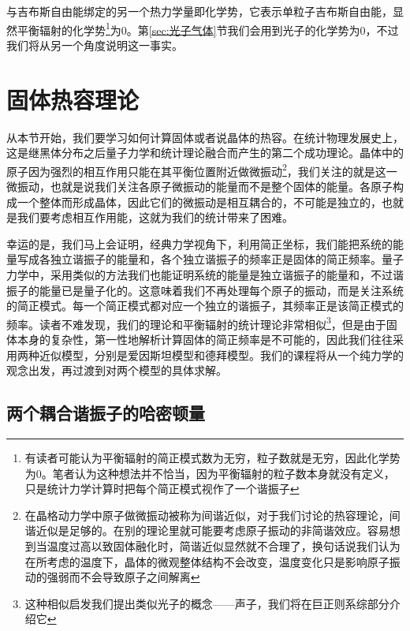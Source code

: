 \documentclass[../../main.tex]{subfiles}
\begin{document}
与吉布斯自由能绑定的另一个热力学量即化学势，它表示单粒子吉布斯自由能，显然平衡辐射的化学势\footnote{有读者可能认为平衡辐射的简正模式数为无穷，粒子数就是无穷，因此化学势为0。笔者认为这种想法并不恰当，因为平衡辐射的粒子数本身就没有定义，只是统计力学计算时把每个简正模式视作了一个谐振子}为0。第\ref{sec:光子气体}节我们会用到光子的化学势为0，不过我们将从另一个角度说明这一事实。

\section{固体热容理论}\label{sec:固体热容理论}
从本节开始，我们要学习如何计算固体或者说晶体的热容。在统计物理发展史上，这是继黑体分布之后量子力学和统计理论融合而产生的第二个成功理论。晶体中的原子因为强烈的相互作用只能在其平衡位置附近做微振动\footnote{在晶格动力学中原子做微振动被称为间谐近似，对于我们讨论的热容理论，间谐近似是足够的。在别的理论里就可能要考虑原子振动的非简谐效应。容易想到当温度过高以致固体融化时，简谐近似显然就不合理了，换句话说我们认为在所考虑的温度下，晶体的微观整体结构不会改变，温度变化只是影响原子振动的强弱而不会导致原子之间解离}，我们关注的就是这一微振动，也就是说我们关注各原子微振动的能量而不是整个固体的能量。各原子构成一个整体而形成晶体，因此它们的微振动是相互耦合的，不可能是独立的，也就是我们要考虑相互作用能，这就为我们的统计带来了困难。

幸运的是，我们马上会证明，经典力学视角下，利用简正坐标，我们能把系统的能量写成各独立谐振子的能量和，各个独立谐振子的频率正是固体的简正频率。量子力学中，采用类似的方法我们也能证明系统的能量是独立谐振子的能量和，不过谐振子的能量已是量子化的。这意味着我们不再处理每个原子的振动，而是关注系统的简正模式。每一个简正模式都对应一个独立的谐振子，其频率正是该简正模式的频率。读者不难发现，我们的理论和平衡辐射的统计理论非常相似\footnote{这种相似启发我们提出类似光子的概念——声子，我们将在巨正则系综部分介绍它}，但是由于固体本身的复杂性，第一性地解析计算固体的简正频率是不可能的，因此我们往往采用两种近似模型，分别是爱因斯坦模型和德拜模型。我们的课程将从一个纯力学的观念出发，再过渡到对两个模型的具体求解。

\subsection{两个耦合谐振子的哈密顿量}
\end{document}
